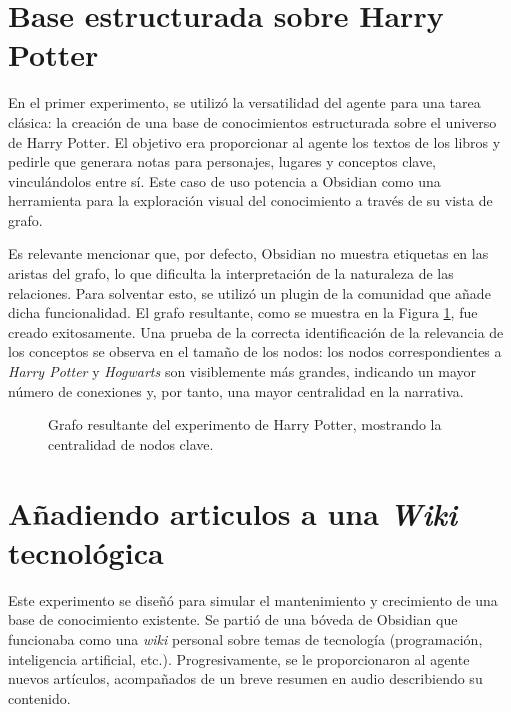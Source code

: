 \section{Base estructurada sobre Harry Potter}
En el primer experimento, se utilizó la versatilidad del agente para una tarea clásica: la creación de una base de conocimientos estructurada sobre el universo de Harry Potter. El objetivo era proporcionar al agente los textos de los libros y pedirle que generara notas para personajes, lugares y conceptos clave, vinculándolos entre sí. Este caso de uso potencia a Obsidian como una herramienta para la exploración visual del conocimiento a través de su vista de grafo.

Es relevante mencionar que, por defecto, Obsidian no muestra etiquetas en las aristas del grafo, lo que dificulta la interpretación de la naturaleza de las relaciones. Para solventar esto, se utilizó un plugin de la comunidad que añade dicha funcionalidad. El grafo resultante, como se muestra en la Figura \ref{fig:hp_graph}, fue creado exitosamente. Una prueba de la correcta identificación de la relevancia de los conceptos se observa en el tamaño de los nodos: los nodos correspondientes a \textit{Harry Potter} y \textit{Hogwarts} son visiblemente más grandes, indicando un mayor número de conexiones y, por tanto, una mayor centralidad en la narrativa.

\begin{figure}[h]
    \centering
    \caption{Grafo resultante del experimento de Harry Potter, mostrando la centralidad de nodos clave.}
    \label{fig:hp_graph}
\end{figure}


\section{Añadiendo articulos a una \textit{Wiki} tecnológica}
Este experimento se diseñó para simular el mantenimiento y crecimiento de una base de conocimiento existente. Se partió de una bóveda de Obsidian que funcionaba como una \textit{wiki} personal sobre temas de tecnología (programación, inteligencia artificial, etc.). Progresivamente, se le proporcionaron al agente nuevos artículos, acompañados de un breve resumen en audio describiendo su contenido.

